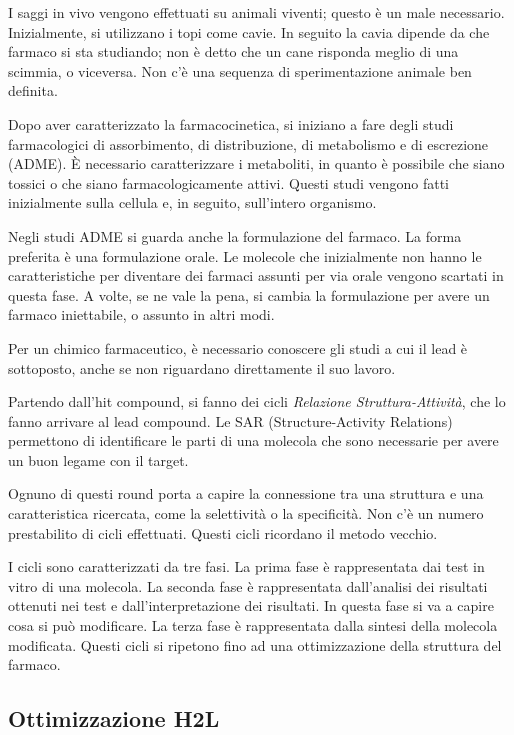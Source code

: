 I saggi in vivo vengono effettuati su animali viventi; questo è un male
necessario. Inizialmente, si utilizzano i topi come cavie. In seguito la
cavia dipende da che farmaco si sta studiando; non è detto che un cane
risponda meglio di una scimmia, o viceversa. Non c'è una sequenza di
sperimentazione animale ben definita.

Dopo aver caratterizzato la farmacocinetica, si iniziano a fare degli
studi farmacologici di assorbimento, di distribuzione, di metabolismo e
di escrezione (ADME). È necessario caratterizzare i metaboliti, in
quanto è possibile che siano tossici o che siano farmacologicamente
attivi. Questi studi vengono fatti inizialmente sulla cellula e, in
seguito, sull'intero organismo.

Negli studi ADME si guarda anche la formulazione del farmaco. La forma
preferita è una formulazione orale. Le molecole che inizialmente non
hanno le caratteristiche per diventare dei farmaci assunti per via orale
vengono scartati in questa fase. A volte, se ne vale la pena, si cambia
la formulazione per avere un farmaco iniettabile, o assunto in altri
modi.

Per un chimico farmaceutico, è necessario conoscere gli studi a cui il
lead è sottoposto, anche se non riguardano direttamente il suo lavoro.

Partendo dall'hit compound, si fanno dei cicli \emph{Relazione
Struttura-Attività}, che lo fanno arrivare al lead compound. Le SAR
(Structure-Activity Relations) permettono di identificare le parti di
una molecola che sono necessarie per avere un buon legame con il target.

Ognuno di questi round porta a capire la connessione tra una struttura e
una caratteristica ricercata, come la selettività o la specificità. Non
c'è un numero prestabilito di cicli effettuati. Questi cicli ricordano
il metodo vecchio.

I cicli sono caratterizzati da tre fasi. La prima fase è rappresentata
dai test in vitro di una molecola. La seconda fase è rappresentata
dall'analisi dei risultati ottenuti nei test e dall'interpretazione dei
risultati. In questa fase si va a capire cosa si può modificare. La
terza fase è rappresentata dalla sintesi della molecola modificata.
Questi cicli si ripetono fino ad una ottimizzazione della struttura del
farmaco.


\subsection{Ottimizzazione H2L}

